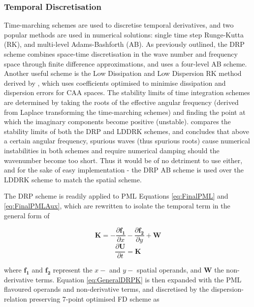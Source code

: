 \subsubsection{Temporal Discretisation} \label{TempDiscrSection}

Time-marching schemes are used to discretise temporal derivatives, and two popular methods are used in numerical solutions: single time step Runge-Kutta (RK), and multi-level Adams-Bashforth (AB). As previously outlined, the DRP scheme \cite{tam193DRP} combines space-time discretisation in the wave number and frequency space through finite difference approximations, and uses a four-level AB scheme. Another useful scheme is the Low Dissipation and Low Dispersion RK method derived by \textcite{hu1996lddrk}, which uses coefficients optimised to minimise dissipation and dispersion errors for CAA spaces. The stability limits of time integration schemes are determined by taking the roots of the effective angular frequency (derived from Laplace transforming the time-marching schemes) and finding the point at which the imaginary components become positive (unstable). \textcite{kubratskii2004reviewcaaalgo} compares the stability limits of both the DRP \cite{tam193DRP} and LDDRK \cite{hu1996lddrk} schemes, and concludes that above a certain angular frequency, spurious waves (thus spurious roots) cause numerical instabilities in both schemes and require numerical damping should the wavenumber become too short. Thus it would be of no detriment to use either, and for the sake of easy implementation - the DRP AB scheme is used over the LDDRK scheme to match the spatial scheme.


The DRP scheme is readily applied to PML Equations \ref{eq:FinalPML} and \ref{eq:FinalPMLAux}, which are rewritten to isolate the temporal term in the general form of

\begin{equation} \label{eq:GeneralDRPK}
    \mathbf{K} = - \frac{\partial \mathbf{f_1}}{\partial x} - \frac{\partial \mathbf{f_2}}{\partial y} + \mathbf{W}
\end{equation}
\begin{equation} \label{eq:GeneralDRPTemporal}
    \frac{\partial \mathbf{U}}{\partial t} = \mathbf{K}
\end{equation}

where $\mathbf{f_1}$ and $\mathbf{f_2}$ represent the $x-$ and $y-$ spatial operands, and $\mathbf{W}$ the non-derivative terms. Equation \ref{eq:GeneralDRPK} is then expanded with the PML flavoured operands and non-derivative terms, and discretised by the dispersion-relation preserving 7-point optimised FD scheme as


